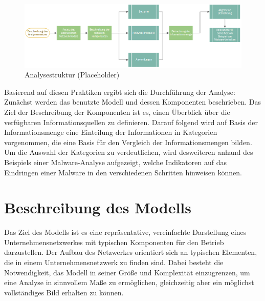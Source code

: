 \begin{figure}[h]
\centering
\includegraphics[width=125mm]{Zeichnungen/Analyseansatz.png}
\caption{Analysestruktur (Placeholder)}
\label{fig:Analysestruktur (Placeholder)}
\end{figure}

Basierend auf diesen Praktiken ergibt sich die Durchführung der Analyse: Zunächst werden das benutzte Modell und dessen Komponenten beschrieben. Das Ziel der Beschreibung der Komponenten ist es, einen Überblick über die verfügbaren Informationsquellen zu definieren. Darauf folgend wird auf Basis der Informationsmenge eine Einteilung der Informationen in Kategorien vorgenommen, die eine Basis für den Vergleich der Informationsmengen bilden.
Um die Auswahl der Kategorien zu verdeutlichen, wird desweiteren anhand des Beispiels einer Malware-Analyse aufgezeigt, welche Indikatoren auf das Eindringen einer Malware in den verschiedenen Schritten hinweisen können.


\section{Beschreibung des Modells}




Das Ziel des Modells ist es eine repräsentative, vereinfachte Darstellung eines Unternehmensnetzwerkes mit typischen Komponenten für den Betrieb darzustellen. Der Aufbau des Netzwerkes orientiert sich an typischen Elementen, die in einem Unternehmensnetzwerk zu finden sind. Dabei besteht die Notwendigkeit, das Modell in seiner Größe und Komplexität einzugrenzen, um eine Analyse in sinnvollem Maße zu ermöglichen, gleichzeitig aber ein möglichst vollständiges Bild erhalten zu können.

